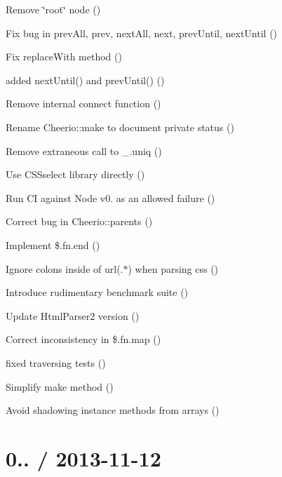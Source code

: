 \begin{DoxyItemize}
\item Remove \char`\"{}root\char`\"{} node ()
\item Fix bug in {\ttfamily prev\+All}, {\ttfamily prev}, {\ttfamily next\+All}, {\ttfamily next}, {\ttfamily prev\+Until}, {\ttfamily next\+Until} ()
\item Fix {\ttfamily replace\+With} method ()
\item added next\+Until() and prev\+Until() ()
\item Remove internal {\ttfamily connect} function ()
\item Rename {\ttfamily Cheerio\+::make} to document private status ()
\item Remove extraneous call to {\ttfamily \+\_\+.\+uniq} ()
\item Use C\+S\+Sselect library directly ()
\item Run CI against Node v0. as an allowed failure ()
\item Correct bug in {\ttfamily Cheerio\+::parents} ()
\item Implement {\ttfamily \$.fn.\+end} ()
\item Ignore colons inside of url(.$\ast$) when parsing css ()
\item Introduce rudimentary benchmark suite ()
\item Update Html\+Parser2 version ()
\item Correct inconsistency in {\ttfamily \$.fn.\+map} ()
\item fixed traversing tests ()
\item Simplify {\ttfamily make} method ()
\item Avoid shadowing instance methods from arrays ()
\end{DoxyItemize}

\section*{0.. / 2013-\/11-\/12 }


